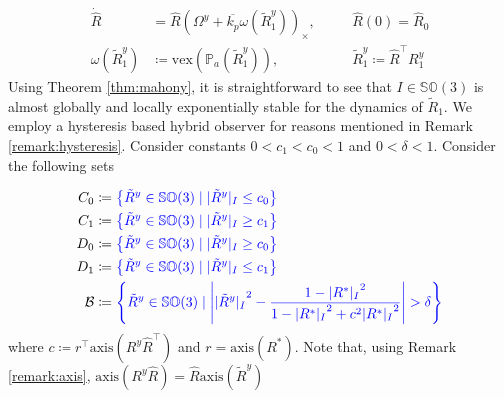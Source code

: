 \documentclass{article}
\newcommand{\SOthree}{\mathbb{SO}(3)}
\newcommand{\axis}[1]{\text{axis}(#1)}
\newcommand{\Omegay}{\Omega^y}
\newcommand{\vex}[1]{\text{vex}\left(#1\right)}
\newcommand{\textblue}[1]{\textcolor{blue}{#1}}
\newcommand{\Rtilde}{\tilde{R}}
\newcommand{\normSOthree}[1]{{{\vert}#1 {\vert}_I}}
\newcommand{\Rstar}{{R^*}}
\begin{document}
\begin{subequations}\label{eq:unstable_observer}
\begin{alignat}{3}
    \dot{\hat{R}} &= \hat{R}\left( \Omegay + \overline{k_p}\omega(\Rtilde_1^y)\right)_\times, \quad &&\hat{R}(0) = \hat{R}_0 \\
    \omega(\Rtilde_1^y) &\coloneqq \vex{\mathbb{P}_a({\Rtilde_1^y})}, \quad &&{\Rtilde_1^y \coloneqq \hat{R}^\top R^y_1}
\end{alignat}
\end{subequations}
Using Theorem \ref{thm:mahony}, it is straightforward to see that  $I\in\SOthree$ is almost globally and locally exponentially stable for the dynamics of $\Rtilde_1$. We employ a hysteresis based hybrid observer for reasons mentioned in Remark \ref{remark:hysteresis}. Consider constants $ 0 < c_1 < c_0 < 1$ and $0<\delta < 1$. Consider the following sets

\begin{subequations}
\begin{align}
    C_0 &\coloneqq \textblue{\left\{\Rtilde^y \in \SOthree \mid \normSOthree{\Rtilde^y} \leq c_0 \right\}}\\
    C_1 &\coloneqq \textblue{\left\{\Rtilde^y \in \SOthree \mid \normSOthree{\Rtilde^y} \geq c_1 \right\}}\\
    D_0 &\coloneqq \textblue{\left\{\Rtilde^y \in \SOthree \mid \normSOthree{\Rtilde^y} \geq c_0 \right\}}\\
    D_1 &\coloneqq \textblue{\left\{\Rtilde^y \in \SOthree \mid \normSOthree{\Rtilde^y} \leq c_1 \right\}}\\
    \mathcal{B} &\coloneqq \textblue{\left\{\Rtilde^y \in \SOthree \mid \left\lvert \normSOthree{\Rtilde^y}^2 - \frac{1 - \normSOthree{\Rstar}^2}{1 - \normSOthree{\Rstar}^2 + c^2 \normSOthree{\Rstar}^2} \right\rvert > \delta\right\}}
\end{align}
\end{subequations}
where $c\coloneqq r^\top \axis{R^y\hat{R}^\top}$ and $r = \axis{\Rstar}$. Note that, using Remark \ref{remark:axis}, $\axis{R^y\hat{R}} = \hat{R}\axis{\Rtilde^y}$
\end{document}
